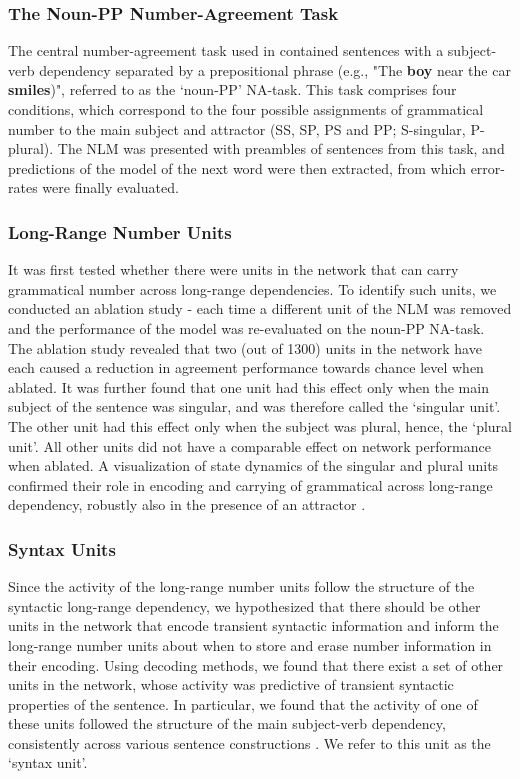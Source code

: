 \subsubsection{The Noun-PP Number-Agreement Task}
The central number-agreement task used in \citet{lakretz2019emergence} contained sentences with a subject-verb dependency separated by a prepositional phrase (e.g., "The \textbf{boy} near the car \textbf{smiles})", referred to as the `noun-PP' NA-task. This task comprises four conditions, which correspond to the four possible assignments of grammatical number to the main subject and attractor (SS, SP, PS and PP; S-singular, P-plural). The NLM was presented with preambles of sentences from this task, and predictions of the model of the next word were then extracted, from which error-rates were finally evaluated. 

\subsubsection{Long-Range Number Units}
It was first tested whether there were units in the network that can carry grammatical number across long-range dependencies. To identify such units, we conducted an ablation study - each time a different unit of the NLM was removed and the performance of the model was re-evaluated on the noun-PP NA-task. The ablation study revealed that two (out of 1300) units in the network have each caused a reduction in agreement performance towards chance level when ablated. It was further found that one unit had this effect only when the main subject of the sentence was singular, and was therefore called the `singular unit'. The other unit had this effect only when the subject was plural, hence, the `plural unit'. All other units did not have a comparable effect on network performance when ablated. A visualization of state dynamics of the singular and plural units confirmed their role in encoding and carrying of grammatical across long-range dependency, robustly also in the presence of an attractor \citep[figure 1 in][]{lakretz2019emergence}.

\subsubsection{Syntax Units}
Since the activity of the long-range number units follow the structure of the syntactic long-range dependency, we hypothesized that there should be other units in the network that encode transient syntactic information and inform the long-range number units about when to store and erase number information in their encoding. Using decoding methods, we found that there exist a set of other units in the network, whose activity was predictive of transient syntactic properties of the sentence. In particular, we found that the activity of one of these units followed the structure of the main subject-verb dependency, consistently across various sentence constructions \citep[figure 3 in][]{lakretz2019emergence}. We refer to this unit as the `syntax unit'.

